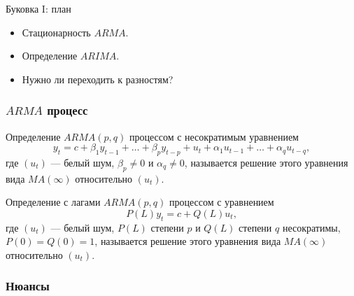 
\begin{frame} %


\end{frame}



\begin{frame}{Буковка I: план}
  \begin{itemize}[<+->]
    \item Стационарность $ARMA$. 
    \item Определение $ARIMA$.
    \item Нужно ли переходить к разностям?
  \end{itemize}

\end{frame}


\begin{frame}
  \frametitle{$ARMA$ процесс}

  \begin{block}{Определение}
    $ARMA(p, q)$ процессом с несократимым уравнением 
    \[
      y_t = c + \beta_1 y_{t-1} + \ldots + \beta_p y_{t-p} + u_t + \alpha_1 u_{t-1} + \ldots + \alpha_q u_{t-q}, 
    \]
    где $(u_t)$ — белый шум, $\beta_p \neq 0$ и $\alpha_q \neq 0$, называется 
    решение этого уравнения вида $MA(\infty)$ относительно $(u_t)$.
  \end{block}

  \pause  
  \begin{block}{Определение с лагами}
    $ARMA(p,q)$ процессом с уравнением 
    \[
      P(L)y_t = c + Q(L)u_t, 
    \]
    где $(u_t)$ — белый шум, $P(L)$ степени $p$ и $Q(L)$ степени $q$ несократимы, $P(0)=Q(0)=1$, 
    называется решение этого уравнения вида $MA(\infty)$ относительно $(u_t)$.  
  \end{block}
\end{frame}

\begin{frame}
  \frametitle{Нюансы}

  \begin{itemize}
    



    
  \end{itemize}

\end{frame}


